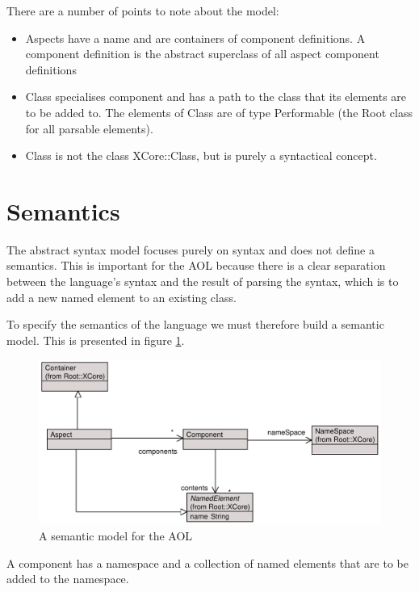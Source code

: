 There are a number of points to note about the model:

\begin{itemize}
\item Aspects have a name and are containers of component
definitions. A component definition is the abstract superclass of
all aspect component definitions  \item Class specialises
component and has a path to the class that its elements are to be
added to. The elements of Class are of type Performable (the Root
class for all parsable elements). \item Class is not the class
XCore::Class, but is purely a syntactical concept.
\end{itemize}

\section{Semantics}

The abstract syntax model focuses purely on syntax and does not
define a semantics. This is important for the AOL because there is
a clear separation between the language's syntax and the result of
parsing the syntax, which is to add a new named element to an
existing class.

To specify the semantics of the language we must therefore build a
semantic model. This is presented in figure \ref{aspectsem}.

\begin{figure}[htb]
\begin{center}
\includegraphics[width=14cm]{CaseStudy1/figures/semantics.pdf}
\caption{A semantic model for the AOL} \label{aspectsem}
\end{center}
\end{figure}

A component has a namespace and a collection of named elements
that are to be added to the namespace.

